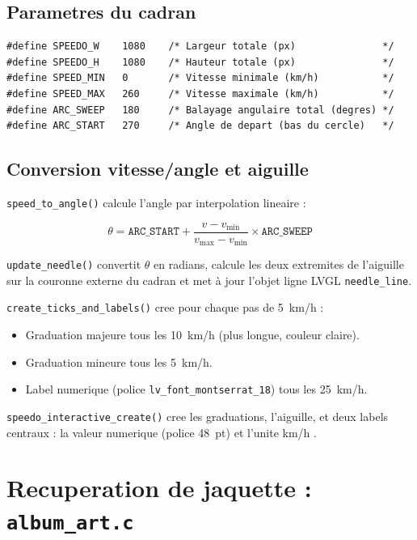 \documentclass[a4paper,11pt]{article}
\begin{document}
\subsection{Parametres du cadran}

\begin{lstlisting}[style=ccode,caption={speedo\_interactive.c --- constantes}]
#define SPEEDO_W    1080    /* Largeur totale (px)               */
#define SPEEDO_H    1080    /* Hauteur totale (px)               */
#define SPEED_MIN   0       /* Vitesse minimale (km/h)           */
#define SPEED_MAX   260     /* Vitesse maximale (km/h)           */
#define ARC_SWEEP   180     /* Balayage angulaire total (degres) */
#define ARC_START   270     /* Angle de depart (bas du cercle)   */
\end{lstlisting}

\subsection{Conversion vitesse/angle et aiguille}

\texttt{speed\_to\_angle()} calcule l'angle par interpolation lineaire :

\[
  \theta = \texttt{ARC\_START} + \frac{v - v_{\min}}{v_{\max} - v_{\min}}
    \times \texttt{ARC\_SWEEP}
\]

\texttt{update\_needle()} convertit $\theta$ en radians, calcule les deux extremites
de l'aiguille sur la couronne externe du cadran et met à jour l'objet ligne LVGL
\texttt{needle\_line}.

\texttt{create\_ticks\_and\_labels()} cree pour chaque pas de 5~km/h :
\begin{itemize}
  \item Graduation majeure tous les 10~km/h (plus longue, couleur claire).
  \item Graduation mineure tous les 5~km/h.
  \item Label numerique (police \texttt{lv\_font\_montserrat\_18}) tous les 25~km/h.
\end{itemize}

\texttt{speedo\_interactive\_create()} cree les graduations, l'aiguille, et deux
labels centraux : la valeur numerique (police 48~pt) et l'unite \og km/h \fg{}.

\section{Recuperation de jaquette : \texttt{album\_art.c}}
\end{document}
